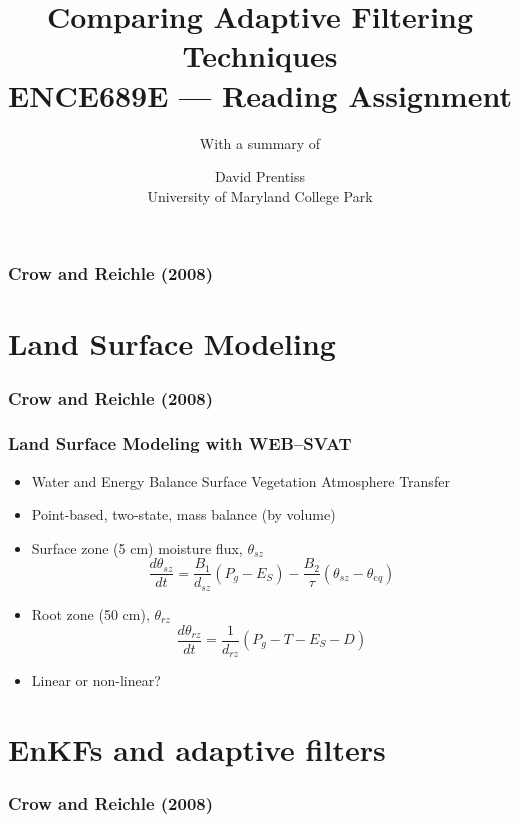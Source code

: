 \documentclass[mathserif]{beamer}
\begin{document}
\nobibliography*
\title{Comparing Adaptive Filtering Techniques \\ ENCE689E --- Reading Assignment}
\author{David Prentiss \\ University of Maryland College Park}
\subtitle{With a summary of \\ }

\frame{\titlepage}

\begin{frame}
  \frametitle{Crow and Reichle (2008)}
  \tableofcontents
\end{frame}

\section{Land Surface Modeling}

\begin{frame}
  \frametitle{Crow and Reichle (2008)}
  \tableofcontents[currentsection]
\end{frame}

\begin{frame}
  \frametitle{Land Surface Modeling with WEB--SVAT}
  \begin{itemize}
    \item Water and Energy Balance Surface Vegetation Atmosphere Transfer
    \item Point-based, two-state, mass balance (by volume)
    \item Surface zone (5 cm) moisture flux, $\theta_{sz}$
      \begin{equation}
        \frac{d\theta_{sz}}{dt}=\frac{B_1}{d_{sz}}\left(P_g - E_S\right)-\frac{B_2}{\tau}\left(\theta_{sz}-\theta_{eq}\right)
      \end{equation}
    \item Root zone (50 cm), $\theta_{rz}$
      \begin{equation}
        \frac{d\theta_{rz}}{dt}=\frac{1}{d_{rz}}\left(P_g - T - E_S - D\right)
      \end{equation}
    \item Linear or non-linear?
  \end{itemize}
\end{frame}

\section{EnKFs and adaptive filters}

\begin{frame}
  \frametitle{Crow and Reichle (2008)}
  \tableofcontents[currentsection]
\end{frame}
\end{document}
